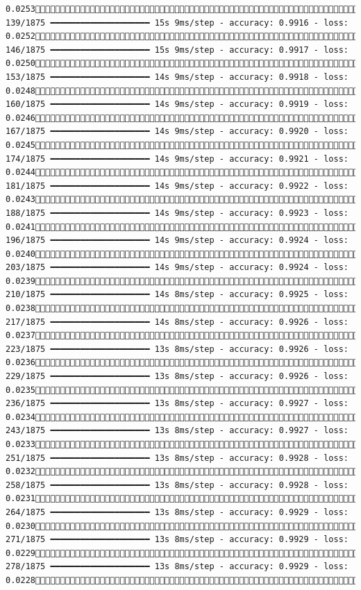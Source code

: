 \documentclass[
  letterpaper,
  DIV=11,
  numbers=noendperiod]{scrreprt}
\begin{document}
\begin{verbatim}
0.0253 139/1875 ━━━━━━━━━━━━━━━━━━━━ 15s 9ms/step - accuracy: 0.9916 - loss: 0.0252 146/1875 ━━━━━━━━━━━━━━━━━━━━ 15s 9ms/step - accuracy: 0.9917 - loss: 0.0250 153/1875 ━━━━━━━━━━━━━━━━━━━━ 14s 9ms/step - accuracy: 0.9918 - loss: 0.0248 160/1875 ━━━━━━━━━━━━━━━━━━━━ 14s 9ms/step - accuracy: 0.9919 - loss: 0.0246 167/1875 ━━━━━━━━━━━━━━━━━━━━ 14s 9ms/step - accuracy: 0.9920 - loss: 0.0245 174/1875 ━━━━━━━━━━━━━━━━━━━━ 14s 9ms/step - accuracy: 0.9921 - loss: 0.0244 181/1875 ━━━━━━━━━━━━━━━━━━━━ 14s 9ms/step - accuracy: 0.9922 - loss: 0.0243 188/1875 ━━━━━━━━━━━━━━━━━━━━ 14s 9ms/step - accuracy: 0.9923 - loss: 0.0241 196/1875 ━━━━━━━━━━━━━━━━━━━━ 14s 9ms/step - accuracy: 0.9924 - loss: 0.0240 203/1875 ━━━━━━━━━━━━━━━━━━━━ 14s 9ms/step - accuracy: 0.9924 - loss: 0.0239 210/1875 ━━━━━━━━━━━━━━━━━━━━ 14s 8ms/step - accuracy: 0.9925 - loss: 0.0238 217/1875 ━━━━━━━━━━━━━━━━━━━━ 14s 8ms/step - accuracy: 0.9926 - loss: 0.0237 223/1875 ━━━━━━━━━━━━━━━━━━━━ 13s 8ms/step - accuracy: 0.9926 - loss: 0.0236 229/1875 ━━━━━━━━━━━━━━━━━━━━ 13s 8ms/step - accuracy: 0.9926 - loss: 0.0235 236/1875 ━━━━━━━━━━━━━━━━━━━━ 13s 8ms/step - accuracy: 0.9927 - loss: 0.0234 243/1875 ━━━━━━━━━━━━━━━━━━━━ 13s 8ms/step - accuracy: 0.9927 - loss: 0.0233 251/1875 ━━━━━━━━━━━━━━━━━━━━ 13s 8ms/step - accuracy: 0.9928 - loss: 0.0232 258/1875 ━━━━━━━━━━━━━━━━━━━━ 13s 8ms/step - accuracy: 0.9928 - loss: 0.0231 264/1875 ━━━━━━━━━━━━━━━━━━━━ 13s 8ms/step - accuracy: 0.9929 - loss: 0.0230 271/1875 ━━━━━━━━━━━━━━━━━━━━ 13s 8ms/step - accuracy: 0.9929 - loss: 0.0229 278/1875 ━━━━━━━━━━━━━━━━━━━━ 13s 8ms/step - accuracy: 0.9929 - loss: 0.0228 
\end{verbatim}
\end{document}
